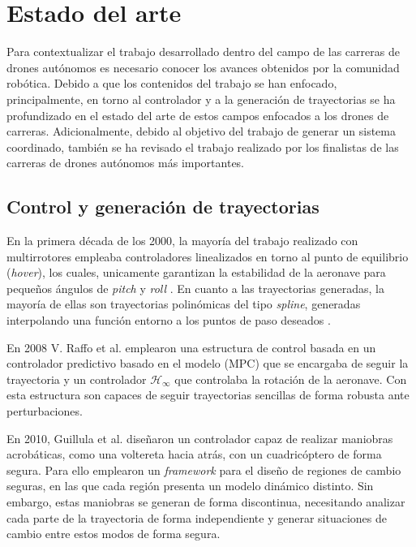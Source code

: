 \chapter{Estado del arte}

Para contextualizar el trabajo desarrollado dentro del campo de las carreras de drones autónomos es necesario conocer los avances obtenidos por la comunidad robótica. Debido a que los contenidos del trabajo se han enfocado, principalmente, en torno al controlador y a la generación de trayectorias se ha profundizado en el estado del arte de estos campos enfocados a los drones de carreras. Adicionalmente, debido al objetivo del trabajo de generar un sistema coordinado, también se ha revisado el trabajo realizado por los finalistas de las carreras de drones autónomos más importantes.

\section{Control y generación de trayectorias}

En la primera década de los 2000, la mayoría del trabajo realizado con multirrotores empleaba controladores linealizados en torno al punto de equilibrio (\textit{hover}), los cuales, unicamente garantizan la estabilidad de la aeronave para pequeños ángulos de \textit{pitch} y \textit{roll} \cite{hoffmann2008quadrotor}. En cuanto a las trayectorias generadas, la mayoría de ellas son trayectorias polinómicas del tipo \textit{spline}, generadas interpolando una función entorno a los puntos de paso deseados \cite{vanek2005}\cite{barrientos2009}.

En 2008 V. Raffo et al. \cite{MPCRaffo2008} emplearon una estructura de control basada en un controlador predictivo basado en el modelo (MPC) que se encargaba de seguir la trayectoria y un controlador $\mathcal{H}_\infty$ que controlaba la rotación de la aeronave. Con esta estructura son capaces de seguir trayectorias sencillas de forma robusta ante perturbaciones.

En 2010, Guillula et al. \cite{gillula2010design} diseñaron un controlador capaz de realizar maniobras acrobáticas, como una voltereta hacia atrás, con un cuadricóptero de forma segura. Para ello emplearon un \textit{framework} para el diseño de regiones de cambio seguras, en las que cada región presenta un modelo dinámico distinto. Sin embargo, estas maniobras se generan de forma discontinua, necesitando analizar cada parte de la trayectoria de forma independiente y generar situaciones de cambio entre estos modos de forma segura. 

